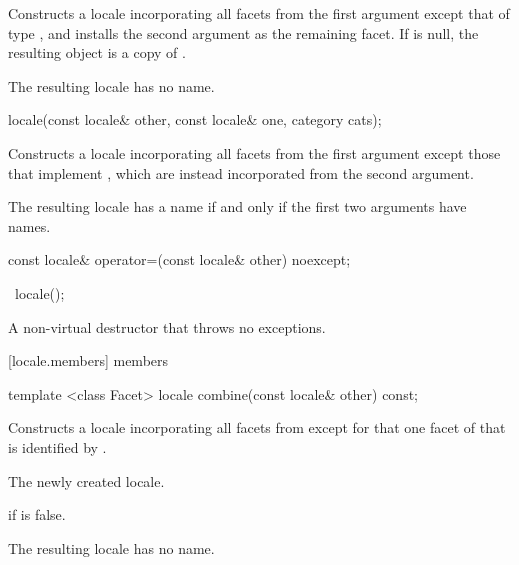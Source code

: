 \begin{itemdescr}
\pnum
\effects
Constructs a locale incorporating all facets from the first
argument except that of type
,
and installs the second argument as the remaining facet.
If 
is null, the resulting object is a copy of .

\pnum
\notes
The resulting locale has no name.
\end{itemdescr}

%
\begin{itemdecl}
locale(const locale& other, const locale& one, category cats);
\end{itemdecl}

\begin{itemdescr}
\pnum
\effects
Constructs a locale incorporating all facets from the first argument
except those that implement
,
which are instead incorporated from the second argument.

\pnum
\notes
The resulting locale has a name if and only if the first two arguments
have names.
\end{itemdescr}

%
%
\begin{itemdecl}
const locale& operator=(const locale& other) noexcept;
\end{itemdecl}

%
\begin{itemdecl}
~locale();
\end{itemdecl}

\begin{itemdescr}
\pnum
A non-virtual destructor that throws no exceptions.
\end{itemdescr}

[locale.members]{ members}

%
%
\begin{itemdecl}
template <class Facet> locale combine(const locale& other) const;
\end{itemdecl}

\begin{itemdescr}
\pnum
\effects
Constructs a locale incorporating
all facets from
except for that one facet of
that is identified by
.

\pnum
\returns
The newly created locale.

\pnum
\throws
{}
if
is false.

\pnum
\notes
The resulting locale has no name.
\end{itemdescr}

